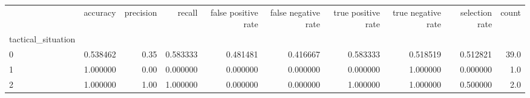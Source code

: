 \begin{tabular}{lrrrrrrrrr}
\toprule
{} &  accuracy &  precision &    recall &  false positive rate &  false negative rate &  true positive rate &  true negative rate &  selection rate &  count \\
tactical\_situation &           &            &           &                      &                      &                     &                     &                 &        \\
\midrule
0                  &  0.538462 &       0.35 &  0.583333 &             0.481481 &             0.416667 &            0.583333 &            0.518519 &        0.512821 &   39.0 \\
1                  &  1.000000 &       0.00 &  0.000000 &             0.000000 &             0.000000 &            0.000000 &            1.000000 &        0.000000 &    1.0 \\
2                  &  1.000000 &       1.00 &  1.000000 &             0.000000 &             0.000000 &            1.000000 &            1.000000 &        0.500000 &    2.0 \\
\bottomrule
\end{tabular}
